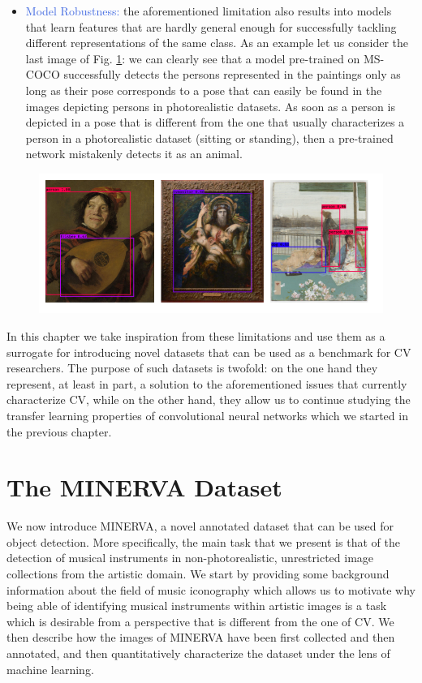 \begin{itemize}
	\item \textcolor{RoyalBlue}{Model Robustness:} the aforementioned limitation also results into models that learn features that are hardly general enough for successfully tackling different representations of the same class. As an example let us consider the last image of Fig. \ref{fig:fails}: we can clearly see that a model pre-trained on MS-COCO successfully detects the persons represented in the paintings only as long as their pose corresponds to a pose that can easily be found in the images depicting persons in photorealistic datasets. As soon as a person is depicted in a pose that is different from the one that usually characterizes a person in a photorealistic dataset (sitting or standing), then a pre-trained network mistakenly detects it as an animal.   
\end{itemize}

\begin{figure}[ht!]
\centering
  \includegraphics[width=\linewidth]{./Images/Chapter05/fails}
  \caption{}
  \label{fig:fails}
\end{figure}

In this chapter we take inspiration from these limitations and use them as a surrogate for introducing novel datasets that can be used as a benchmark for CV researchers. The purpose of such datasets is twofold: on the one hand they represent, at least in part, a solution to the aforementioned issues that currently characterize CV, while on the other hand, they allow us to continue studying the transfer learning properties of convolutional neural networks which we started in the previous chapter.  

\section{The MINERVA Dataset}
\label{sec:minerva_dataset}

We now introduce MINERVA, a novel annotated dataset that can be used for object detection. More specifically, the main task that we present is that of the detection of musical instruments in non-photorealistic, unrestricted image collections from the artistic domain. We start by providing some background information about the field of music iconography which allows us to motivate why being able of identifying musical instruments within artistic images is a task which is desirable from a perspective that is different from the one of CV. We then describe how the images of MINERVA have been first collected and then annotated, and then quantitatively characterize the dataset under the lens of machine learning.    

